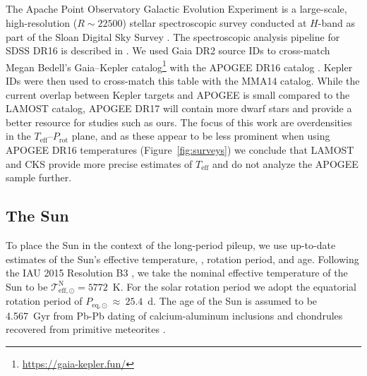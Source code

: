 \documentclass[trackchanges,twocolumn]{aastex631}
\newcommand{\mma}{MMA14\xspace}
\newcommand{\teff}{\ensuremath{T_{\mathrm{eff}}}\xspace}
\newcommand{\prot}{\ensuremath{P_\mathrm{rot}}\xspace}
\begin{document}
\newpage
\subsection{}
The Apache Point Observatory Galactic Evolution Experiment \citep[APOGEE;][]{Majewski2017} is a large-scale, high-resolution ($R \sim 22500$) stellar spectroscopic survey conducted at $H$-band as part of the Sloan Digital Sky Survey \citep[SDSS-IV;][]{Blanton2017}. The spectroscopic analysis pipeline for SDSS DR16 is described in \citet{Jonsson2020}. We used Gaia DR2 source IDs \citep{Gaia2016, Gaia2018} to cross-match Megan Bedell's Gaia--Kepler catalog\footnote{\url{https://gaia-kepler.fun/}} with the APOGEE DR16 catalog \citep{Ahumada2020}. Kepler IDs were then used to cross-match this table with the \mma catalog. While the current overlap between Kepler targets and APOGEE is small compared to the LAMOST catalog, APOGEE DR17 will contain more dwarf stars and provide a better resource for studies such as ours. The focus of this work are overdensities in the \teff--\prot plane, and as these appear to be less prominent when using  APOGEE DR16 temperatures (Figure~\ref{fig:surveys}) we conclude that LAMOST and CKS provide more precise estimates of \teff and do not analyze the APOGEE sample further. 

\subsection{The Sun}
To place the Sun in the context of the long-period pileup, we use up-to-date estimates of the Sun's effective temperature, , rotation period, and age. Following the IAU 2015 Resolution B3 \citep{Prsa2016}, we take the nominal effective temperature of the Sun to be $\mathcal{T}^\mathrm{N}_\mathrm{eff,\odot} = 5772$~K.  For the solar rotation period we adopt the equatorial rotation period of $P_\mathrm{eq,\odot}~\approx~25.4$~d.  The age of the Sun is assumed to be 4.567~Gyr from Pb-Pb dating of calcium-aluminum inclusions and chondrules recovered from primitive meteorites \citep[][and references therein]{Bahcall1995}.
\end{document}
